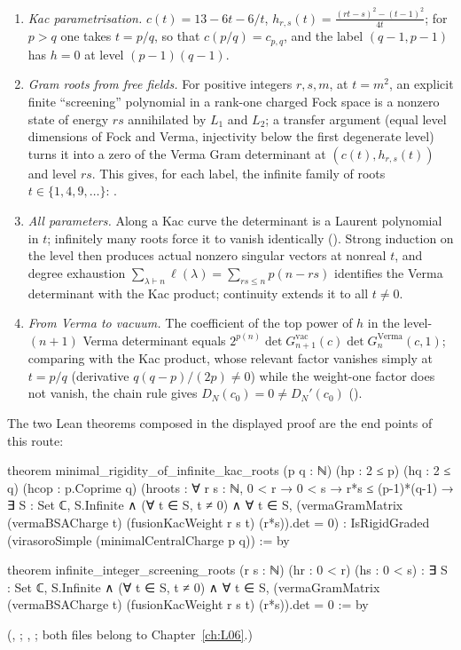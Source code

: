 \begin{enumerate}[label=(\alph*)]
\item \emph{Kac parametrisation.} $c(t) = 13-6t-6/t$, $h_{r,s}(t) = \frac{(rt-s)^2-(t-1)^2}{4t}$; for $p>q$ one takes
  $t = p/q$, so that $c(p/q) = c_{p,q}$, and the label $(q-1,p-1)$ has $h = 0$ at level $(p-1)(q-1)$.
\item \emph{Gram roots from free fields.} For positive integers $r,s,m$, at $t = m^2$, an explicit finite
  ``screening'' polynomial in a rank-one charged Fock space is a nonzero state of energy $rs$ annihilated by
  $L_1$ and $L_2$; a transfer argument (equal level dimensions of Fock and Verma, injectivity below the first
  degenerate level) turns it into a zero of the Verma Gram determinant at $(c(t),h_{r,s}(t))$ and level $rs$.
  This gives, for each label, the infinite family of roots $t\in\{1,4,9,\dots\}$:
  .
\item \emph{All parameters.} Along a Kac curve the determinant is a Laurent polynomial in $t$; infinitely many
  roots force it to vanish identically (). Strong induction on the level then
  produces actual nonzero singular vectors at nonreal $t$, and degree exhaustion
  $\sum_{\lambda\vdash n}\ell(\lambda) = \sum_{rs\le n}p(n-rs)$ identifies the Verma determinant with the Kac product;
  continuity extends it to all $t\ne0$.
\item \emph{From Verma to vacuum.} The coefficient of the top power of $h$ in the level-$(n+1)$ Verma determinant
  equals $2^{p(n)}\det G^{\mathrm{vac}}_{n+1}(c)\det G^{\mathrm{Verma}}_n(c,1)$; comparing with the Kac product, whose
  relevant factor vanishes simply at $t = p/q$ (derivative $q(q-p)/(2p)\neq0$) while the weight-one factor does not
  vanish, the chain rule gives $D_N(c_0) = 0\neq D_N'(c_0)$ ().
\end{enumerate}
The two Lean theorems composed in the displayed proof are the end points of this route:
\begin{leancode}
theorem minimal_rigidity_of_infinite_kac_roots (p q : ℕ) (hp : 2 ≤ p)
    (hq : 2 ≤ q) (hcop : p.Coprime q)
    (hroots : ∀ r s : ℕ, 0 < r → 0 < s → r*s ≤ (p-1)*(q-1) →
      ∃ S : Set ℂ, S.Infinite ∧ (∀ t ∈ S, t ≠ 0) ∧
        ∀ t ∈ S, (vermaGramMatrix (vermaBSACharge t)
          (fusionKacWeight r s t) (r*s)).det = 0) :
    IsRigidGraded (virasoroSimple (minimalCentralCharge p q)) := by

theorem infinite_integer_screening_roots (r s : ℕ) (hr : 0 < r) (hs : 0 < s) :
    ∃ S : Set ℂ, S.Infinite ∧ (∀ t ∈ S, t ≠ 0) ∧
      ∀ t ∈ S, (vermaGramMatrix (vermaBSACharge t)
        (fusionKacWeight r s t) (r*s)).det = 0 := by
\end{leancode}
(,
;
,
; both files belong to Chapter~\ref{ch:L06}.)

